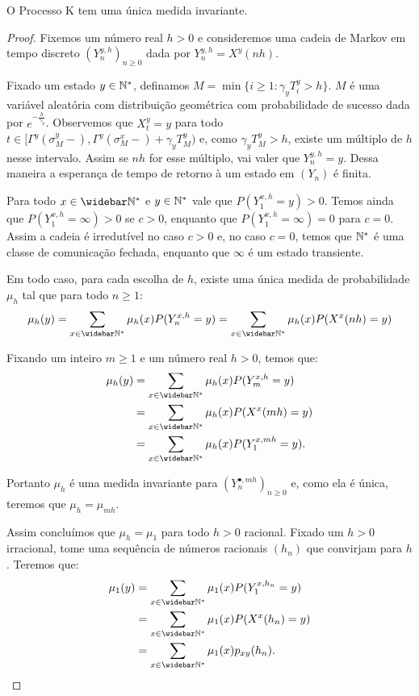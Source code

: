 \begin{proposicao}
  \label{prop:existe-unica-invariante}
  O Processo K tem uma única medida invariante.
\end{proposicao}
\begin{proof}
  Fixemos um número real $h > 0$ e consideremos uma cadeia de Markov em
  tempo discreto $(Y^{y, h}_n)_{n \geq 0}$ dada por $Y^{y, h}_n =
  X^y(n h)$.

  Fixado um estado $y \in {\mathbb{N^*}}$, definamos $M = \min \{ i \geq 1:
  \gamma_y T_i^y > h \}$. $M$ é uma variável aleatória com
  distribuição geométrica com probabilidade de sucesso dada por
  $e^{-\frac{h}{\gamma_y}}$. Observemos que $X_t^y = y$ para todo $t
  \in [\Gamma^y(\sigma_M^y-), \Gamma^y(\sigma_M^x-) + \gamma_y T_M^y)$
  e, como $\gamma_y T_M^y > h$, existe um múltiplo de $h$ nesse
  intervalo. Assim se $n h$ for esse múltiplo, vai valer que $Y_n^{y,
    h} = y$. Dessa maneira a esperança de tempo de retorno à um estado
  em $(Y_n)$ é finita.

  Para todo $x \in \Nzb$ e $y \in {\mathbb{N^*}}$ vale que $P (Y^{x, h}_1 = y) >
  0$.  Temos ainda que $P (Y^{x, h}_1 = \infty ) > 0$ se $c > 0$,
  enquanto que $P (Y^{x, h}_1 = \infty) = 0$ para $c = 0$. Assim a
  cadeia é irredutível no caso $c > 0$ e, no caso $c = 0$, temos que
  ${\mathbb{N^*}}$ é uma classe de comunicação fechada, enquanto que $\infty$ é
  um estado transiente.


  Em todo caso, para cada escolha de $h$, existe uma única medida de
  probabilidade $\mu_h$ tal que para todo $n \geq 1$:
  \begin{displaymath}
    \mu_h (y) = \sum_{x \in \Nzb} \mu_h(x) P ( Y_n^ {x, h} = y) =
    \sum_{x \in \Nzb} \mu_h(x) P ( X^x (nh) = y)
  \end{displaymath}

  Fixando um inteiro $m \geq 1$ e um número real $h > 0$, temos que:
  \begin{align*}
    \mu_h (y) &= \sum_{x \in \Nzb} \mu_h(x) P ( Y_{m}^ {x, h} = y)\\
    &= \sum_{x \in \Nzb} \mu_h(x) P ( X^x (m h) = y) \\
    &= \sum_{x \in \Nzb} \mu_h(x) P ( Y_{1}^ {x, m h} = y).
  \end{align*}

  Portanto $\mu_h$ é uma medida invariante para $(Y^{\bullet, mh}_n)_{n
    \geq 0}$ e, como ela é única, teremos que $\mu_h = \mu_{m h}$.

  Assim concluímos que $\mu_{h} = \mu_1$ para todo $h > 0$ racional.
  Fixado um $h > 0$ irracional, tome uma sequência de números
  racionais $(h_n)$ que convirjam para $h$. Teremos que:
  \begin{align*}
    \mu_1(y) &= \sum_{x \in \Nzb} \mu_1(x) P ( Y_{1}^ {x, h_n} = y)\\
    &= \sum_{x \in \Nzb} \mu_1(x) P ( X^x(h_n) = y)\\
    &= \sum_{x \in \Nzb} \mu_1(x) p_{x y} (h_n).    
  \end{align*}
  

\end{proof}

